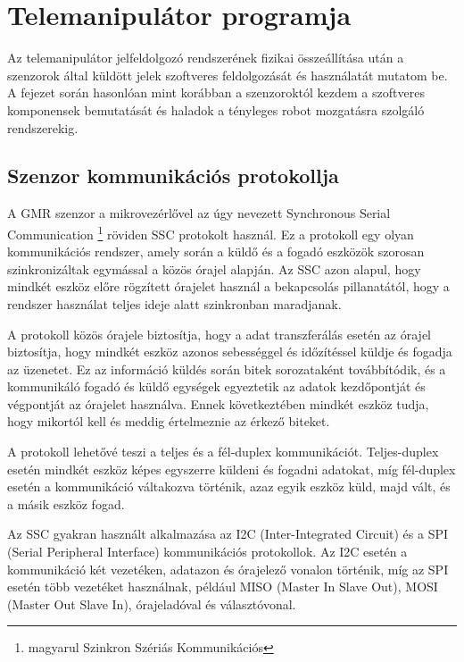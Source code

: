\chapter{Telemanipulátor programja}
\label{sec:LatexTools}

Az telemanipulátor jelfeldolgozó rendszerének fizikai összeállítása után a szenzorok által küldött jelek szoftveres feldolgozását és használatát mutatom be. A fejezet során hasonlóan mint korábban a szenzoroktól kezdem a szoftveres komponensek bemutatását és haladok a tényleges robot mozgatásra szolgáló rendszerekig.

\section{Szenzor kommunikációs protokollja}
A GMR szenzor a mikrovezérlővel az úgy nevezett Synchronous Serial Communication \footnote{magyarul Szinkron Szériás Kommunikációs} röviden SSC protokolt használ. Ez a  protokoll egy olyan kommunikációs rendszer, amely során a küldő és a fogadó eszközök szorosan szinkronizáltak egymással a közös órajel alapján. Az SSC azon alapul, hogy mindkét eszköz előre rögzített órajelet használ a bekapcsolás pillanatától, hogy a rendszer használat teljes ideje alatt szinkronban maradjanak.

A protokoll közös órajele biztosítja, hogy a adat transzferálás esetén az órajel biztosítja, hogy mindkét eszköz azonos sebességgel és időzítéssel küldje és fogadja az üzenetet. Ez az információ küldés során bitek sorozataként továbbítódik, és a kommunikáló fogadó és küldő egységek egyeztetik az adatok kezdőpontját és végpontját az órajelet használva. Ennek következtében mindkét eszköz tudja, hogy mikortól kell és meddig értelmeznie az érkező biteket.


A protokoll lehetővé teszi a teljes és a fél-duplex kommunikációt. Teljes-duplex esetén mindkét eszköz képes egyszerre küldeni és fogadni adatokat, míg fél-duplex esetén a kommunikáció váltakozva történik, azaz egyik eszköz küld, majd vált, és a másik eszköz fogad.

Az SSC gyakran használt alkalmazása az I2C (Inter-Integrated Circuit) és a SPI (Serial Peripheral Interface) kommunikációs protokollok. Az I2C esetén a kommunikáció két vezetéken, adatazon és órajelező vonalon történik, míg az SPI esetén több vezetéket használnak, például MISO (Master In Slave Out), MOSI (Master Out Slave In), órajeladóval és választóvonal.

